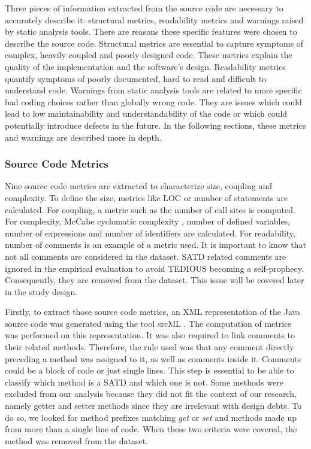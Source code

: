 Three pieces of information extracted from the source code are necessary to accurately describe it: structural metrics, readability metrics and warnings raised by static analysis tools. There are reasons these specific features were chosen to describe the source code. Structural metrics are essential to capture symptoms of complex, heavily coupled and poorly designed code. These metrics explain the quality of the implementation and the software's design. Readability metrics quantify symptoms of poorly documented, hard to read and difficult to understand code. Warnings from static analysis tools are related to more specific bad coding choices rather than globally wrong code. They are issues which could lead to low maintainability and understandability of the code or which could potentially introduce defects in the future. In the following sections, these metrics and warnings are described more in depth.

\subsubsection{Source Code Metrics}

Nine source code metrics are extracted to characterize size, coupling and complexity. To define the size, metrics like \ac{LOC} or number of statements are calculated. For coupling, a metric such as the number of call sites is computed. For complexity, McCabe cyclomatic complexity \citep{mccabe1990reverse}, number of defined variables, number of expressions and number of identifiers are calculated. For readability, number of comments is an example of a metric used. It is important to know that not all comments are considered in the dataset. \ac{SATD} related comments are ignored in the empirical evaluation to avoid \ac{TEDIOUS} becoming a self-prophecy. Consequently, they are removed from the dataset. This issue will be covered later in the study design. \par

Firstly, to extract those source code metrics, an XML representation of the Java source code was generated using the tool srcML \citep{CollardKM03}. The computation of metrics was performed on this representation. It was also required to link comments to their related methods. Therefore, the rule used was that any comment directly preceding a method was assigned to it, as well as comments inside it. Comments could be a block of code or just single lines. This step is essential to be able to classify which method is a \ac{SATD} and which one is not. Some methods were excluded from our analysis because they did not fit the context of our research, namely getter and setter methods since they are irrelevant with design debts. To do so, we looked for method prefixes matching \emph{get} or \emph{set} and methods made up from more than a single line of code. When these two criteria were covered, the method was removed from the dataset. \par 

